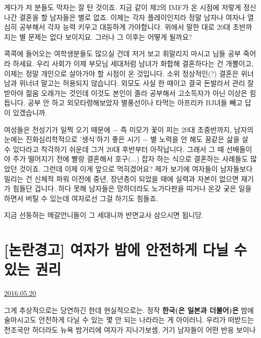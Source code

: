 게다가 저 분들도 막차는 잘 탄 것이죠. 지금 같이 제2의 IMF가 온 시점에 저렇게 정신나간 결혼을 할 남자들은 별로 없죠.
이제는 각자 플레이인지라 정말 남자나 여자나 열심히 공부해서 각자 능력 키우고 대등하게 가야합니다.
위에서 말한 대로 20대 초반까지는 별 문제는 없다 보이지요. 그러나 그 이후는 어떻게 될까요?
\vspace{5mm}

콕콕에 들어오는 여학생분들도 많으실 건데 저거 보고 휘말리지 마시고 님들 공부 죽어라 하세요.
우리 사회가 이제 부모님 세대처럼 남녀가 화합해 결혼하다는 건 개뿔이고, 이제는 정말 개인으로 살아가야 할 시점이 온 것입니다.
소위 정상적인(?) 결혼은 위너남과 위너녀 말고는 허용되지 않습니다.
외모도 사실 한 때이고 결국 돈발라서 관리 잘 받아야 젊음 오래가는 것인데 이것도 본인이 졸라 공부해서 고소득자가 아닌 이상은 힘듭니다.
공부 안 하고 외모타령해보았자 별풍선이나 타먹는 아프리카 BJ녀들 빼고 답이 있겠습니까.
\vspace{5mm}

여성들은 전성기가 일찍 오기 때문에 $-$ 즉 미모가 꽃이 피는 20대 초중반까지, 남자의 눈에는 진화심리학적으로 '생식'하기 좋은 시기 $-$
별 노력을 안 해도 꿈같은 삶을 살 수 있다라고 착각하기 쉬운데 그거 20대 후반부터 아작납니다.
그래서 그 때 선배들이야 주가 떨어지기 전에 빨랑 결혼해서 호구(...) 잡자 하는 식으로 결혼하는 사례들도 많았던 것이죠.
그런데 이제 이게 앞으로 먹히겠어요?
제가 보기에 여자들이 남자들보다 밀리는 건 신체적 파워 이전에 중년, 장년층이 되었을 때에 실력과 자본이 없으면 재기가 힘들단 겁니다.
하다 못해 남자들은 망하더라도 노가다판을 띠거나 온갖 궂은 일을 하면서 버틸 수 있는데 여자로선 그걸 하기도 힘들죠.
\vspace{5mm}

지금 선동하는 메갈언니들이 그 세대니까 반면교사 삼으시면 됩니당.
\vspace{5mm}



\section{[논란경고] 여자가 밤에 안전하게 다닐 수 있는 권리}
\href{https://www.kockoc.com/Apoc/784431}{2016.05.20}

\vspace{5mm}

그게 추상적으로는 당연하긴 한데 현실적으로는.
정작 \textbf{한국(은 일본과 더불어)은} 밤에 술마시고도 안전하게 다닐 수 있는 몇 안 되는 나라라는 게 아이러니.
우리가 떠받드는 천조국만 하더라도 뉴욕 밤거리에 여자가 지나가보셈, 거기 남자들이 어떤 반응 보이나
\vspace{5mm}

